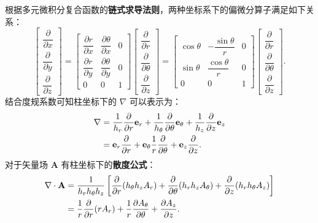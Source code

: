 \documentclass[12pt,a4paper,fontset=none]{ctexart}
\begin{document}
\newpage
根据多元微积分复合函数的\textbf{链式求导法则}，两种坐标系下的偏微分算子满足如下关系：
\begin{equation}
\begin{bmatrix}
\dfrac{\partial}{\partial x} \\[10pt]
\dfrac{\partial}{\partial y} \\[10pt]
\dfrac{\partial}{\partial z}
\end{bmatrix}
=
\begin{bmatrix}
\dfrac{\partial r}{\partial x} & \dfrac{\partial\theta}{\partial x} & 0 \\[10pt]
\dfrac{\partial r}{\partial y} & \dfrac{\partial\theta}{\partial y} & 0 \\[10pt]
0 & 0 & 1
\end{bmatrix}
\begin{bmatrix}
\dfrac{\partial}{\partial r} \\[10pt]
\dfrac{\partial}{\partial\theta} \\[10pt]
\dfrac{\partial}{\partial z}
\end{bmatrix}
=
\begin{bmatrix}
\cos\theta & -\dfrac{\sin\theta}{r} & 0 \\[10pt]
\sin\theta & \dfrac{\cos\theta}{r} & 0 \\[10pt]
0 & 0 & 1
\end{bmatrix}
\begin{bmatrix}
\dfrac{\partial}{\partial r} \\[10pt]
\dfrac{\partial}{\partial\theta} \\[10pt]
\dfrac{\partial}{\partial z}
\end{bmatrix}.\label{eq:jacobi_transform}
\end{equation}
结合度规系数可知柱坐标下的 $\nabla$ 可以表示为：
\begin{align}
\nabla &= \frac{1}{h_r}\frac{\partial}{\partial r}\mathbf{e}_r + \frac{1}{h_\theta}\frac{\partial}{\partial\theta}\mathbf{e}_\theta + \frac{1}{h_z}\frac{\partial}{\partial z}\mathbf{e}_z \notag\\
&= \mathbf{e}_r\frac{\partial}{\partial r} + \mathbf{e}_\theta\frac1r\frac{\partial}{\partial\theta} + \mathbf{e}_z\frac{\partial}{\partial z}.\label{eq:grad_cyl}
\end{align}
对于矢量场 $\mathbf{A}$ 有柱坐标下的\textbf{散度公式}：
\begin{align}
\nabla\cdot\mathbf{A} &= \frac{1}{h_rh_\theta h_z}\left[\frac{\partial}{\partial r}(h_\theta h_zA_r) + \frac{\partial}{\partial\theta}(h_rh_zA_\theta) + \frac{\partial}{\partial z}(h_rh_\theta A_z)\right] \notag\\
&= \frac1r\frac{\partial}{\partial r}(rA_r) + \frac1r\frac{\partial A_\theta}{\partial\theta} + \frac{\partial A_z}{\partial z}.\label{eq:div_cyl}
\end{align}
\end{document}
